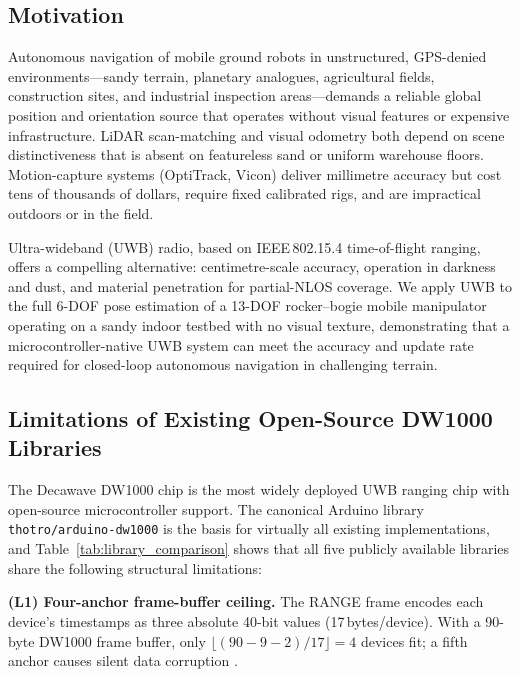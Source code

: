 
\subsection{Motivation}

Autonomous navigation of mobile ground robots in unstructured, GPS-denied
environments---sandy terrain, planetary analogues, agricultural fields,
construction sites, and industrial inspection areas---demands a reliable
global position and orientation source that operates without visual
features or expensive infrastructure.
LiDAR scan-matching and visual odometry both depend on scene distinctiveness
that is absent on featureless sand or uniform warehouse floors.
Motion-capture systems (OptiTrack, Vicon) deliver millimetre accuracy but
cost tens of thousands of dollars, require fixed calibrated rigs, and
are impractical outdoors or in the field.

Ultra-wideband (UWB) radio, based on IEEE\,802.15.4 time-of-flight ranging,
offers a compelling alternative: centimetre-scale accuracy, operation in
darkness and dust, and material penetration for partial-NLOS coverage.
We apply UWB to the full 6-DOF pose estimation of a 13-DOF rocker--bogie
mobile manipulator operating on a sandy indoor testbed with no visual texture,
demonstrating that a microcontroller-native UWB system can meet the accuracy
and update rate required for closed-loop autonomous navigation in challenging
terrain.

\subsection{Limitations of Existing Open-Source DW1000 Libraries}
\label{sec:limitations}

The Decawave DW1000 chip \cite{dw1000_datasheet} is the most widely deployed
UWB ranging chip with open-source microcontroller support.
The canonical Arduino library \texttt{thotro/arduino-dw1000} \cite{thotro_dw1000}
is the basis for virtually all existing implementations, and
Table~\ref{tab:library_comparison} shows that all five publicly available
libraries share the following structural limitations:

\textbf{(L1) Four-anchor frame-buffer ceiling.}
The RANGE frame encodes each device's timestamps as three absolute 40-bit
values (17\,bytes/device).
With a 90-byte DW1000 frame buffer, only $\lfloor(90-9-2)/17\rfloor = 4$
devices fit; a fifth anchor causes silent data corruption \cite{thotro_dw1000}.

